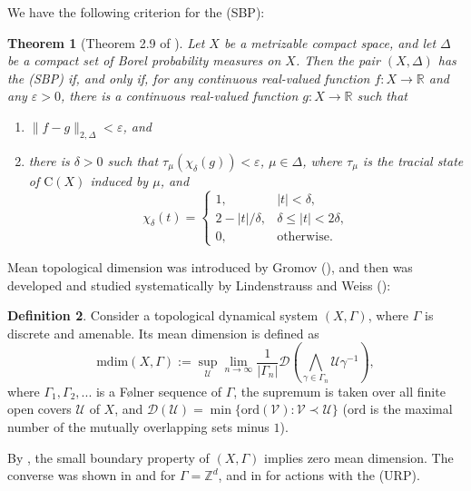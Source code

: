 \documentclass[12pt, oneside, psamsfonts]{amsart}
\newtheorem{thm}{Theorem}[section]
\theoremstyle{definition}
\newtheorem{defn}[thm]{Definition}
\theoremstyle{remark}
\numberwithin{equation}{section}
\newcommand{\norm}[1]{\| #1\|}
\newcommand{\abs}[1]{| #1 |}
\newcommand{\Real}{\mathbb R}
\newcommand{\Int}{\mathbb Z}
\newcommand{\eps}{\varepsilon}
\begin{document}
We have the following criterion for the (SBP):
\begin{thm}[Theorem 2.9 of \cite{EN-SBP-I}]\label{SBP-2-norm}
Let $X$ be a metrizable compact space, and let $\Delta$ be a compact set of Borel probability measures on $X$. Then the pair $(X, \Delta)$ has the (SBP) if, and only if, for any continuous real-valued function $f: X \to \Real$ and any $\eps>0$, there is a continuous real-valued function $g: X\to \Real$ such that
\begin{enumerate}
\item $\norm{f - g}_{2, \Delta} < \eps$, and 
\item there is $\delta>0$ such that $\tau_\mu(\chi_{\delta}(g)) < \eps$, $\mu \in\Delta$,
where $\tau_\mu$ is the tracial state of $\mathrm{C}(X)$ induced by $\mu$, and
\begin{equation*}
\chi_\delta(t) = \left\{ \begin{array}{ll}
1, & \abs{t} < \delta, \\
2-\abs{t}/\delta, & \delta\leq \abs{t} < 2\delta, \\
0, & \mathrm{otherwise}.
\end{array}\right.
\end{equation*}
\end{enumerate} 
\end{thm}


Mean topological dimension was introduced by Gromov (\cite{Gromov-MD}), and then was developed and studied systematically by Lindenstrauss and Weiss (\cite{Lindenstrauss-Weiss-MD}):
\begin{defn}
Consider a topological dynamical system $(X, \Gamma)$, where $\Gamma$ is discrete and amenable. Its mean dimension is defined as
$$\mathrm{mdim}(X, \Gamma):= \sup_{\mathcal U} \lim_{n \to\infty} \frac{1}{\abs{\Gamma_n}}\mathcal D( \bigwedge_{\gamma \in \Gamma_n} \mathcal U \gamma^{-1} ),$$
where $\Gamma_1, \Gamma_2, ...$ is a F{\o}lner sequence of $\Gamma$, the supremum is taken over all finite open covers $\mathcal U$ of $X$, and $\mathcal D(\mathcal U) = \min\{\mathrm{ord}(\mathcal V): \mathcal V \prec \mathcal U\}$ ($\mathrm{ord}$ is the maximal number of the mutually overlapping sets minus $1$).
\end{defn}

By \cite{Lindenstrauss-Weiss-MD}, the small boundary property of $(X, \Gamma)$ implies zero mean dimension. The converse was shown in \cite{MR3614036} and \cite{GLT-Zk} for $\Gamma = \Int^d$, and in \cite{Niu-MD-Zd} for actions with the (URP). 
\end{document}
